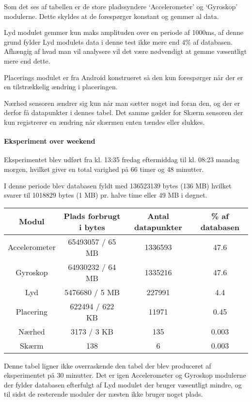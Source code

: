 Som det ses af tabellen er de store pladssyndere `Accelerometer' og `Gyroskop' modulerne.
Dette skyldes at de forespørger konstant og gemmer al data.

Lyd modulet gemmer kun maks amplituden over en periode af 1000ms, af denne grund fylder Lyd modulets data i denne test ikke mere end 4\% af databasen.
Afhængig af hvad man vil analysere vil det være nødvendigt at gemme væsentligt mere end dette.

Placerings modulet er fra Android konstrueret så den kun forespørger når der er en tilstrækkelig ændring i placeringen.

Nærhed sensoren ændrer sig kun når man sætter noget ind foran den, og der er derfor få datapunkter i dennes tabel.
Det samme gælder for Skærm sensoren der kun registrerer en ændring når skærmen enten tændes eller slukkes.	

\paragraph{Eksperiment over weekend}

Eksperimentet blev udført fra kl. 13:35 fredag eftermiddag til kl. 08:23 mandag morgen, hvilket giver en total varighed på 66 timer og 48 minutter.

I denne periode blev databasen fyldt med 136523139 bytes (136 MB) hvilket svarer til 1018829 bytes (1 MB) pr. halve time eller 49 MB i døgnet.

\begin{tabular}{|c|c|c|c|}
	\hline Modul 		 & Plads forbrugt i bytes	  	& Antal datapunkter & \% af databasen \\
	\hline Accelerometer & 65493057 / 65 MB   			& 1336593    		& 47.6 \\ 
	\hline Gyroskop 	 & 64930232 / 64 MB  			& 1335216   		& 47.6\\ 
	\hline Lyd 		  	 & 5476680  / 5  MB  			& 227991     		& 4.4 \\ 
	\hline Placering 	 & 622494 	/ 622 KB			& 11971      		& 0.45 \\ 
	\hline Nærhed    	 & 3173 	/ 3 KB				& 135 				& 0.003 \\ 
	\hline Skærm 		 & 138           				& 6          		& 0.003 \\ 
	\hline 
\end{tabular} 

Denne tabel ligner ikke overraskende den tabel der blev produceret af eksperimentet på 30 minutter.
Det er igen Accelerometer og Gyroskop modulerne der fylder databasen efterfulgt af Lyd modulet der bruger væsentligt mindre, og til sidst de resterende moduler der næsten ikke bruger noget plads.

